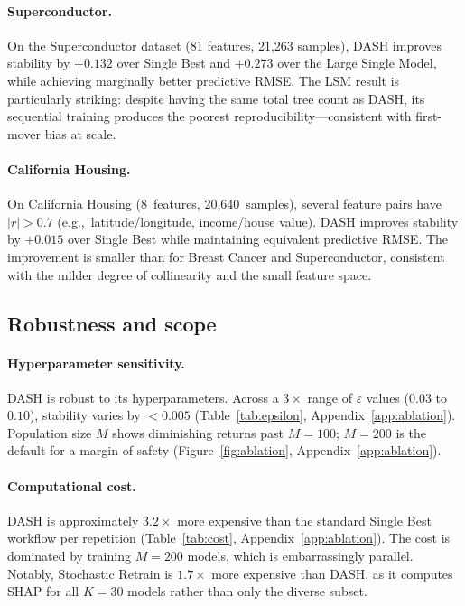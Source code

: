 \documentclass[11pt]{article}
\newcommand{\dash}{\textsc{DASH}}
\newcommand{\eg}{e.g.,\ }
\begin{document}
\paragraph{Superconductor.}
On the Superconductor dataset (81 features, 21,263 samples), \dash{}
improves stability by $+0.132$ over Single Best and $+0.273$ over the
Large Single Model, while achieving marginally better predictive RMSE.
The LSM result is particularly striking: despite having the same total tree count
as \dash{}, its sequential training produces the
poorest reproducibility---consistent with first-mover bias at scale.

\paragraph{California Housing.}
On California Housing (8~features, 20,640~samples), several feature
pairs have $|r| > 0.7$ (\eg latitude/longitude, income/house value).
\dash{} improves stability by $+0.015$ over Single Best while
maintaining equivalent predictive RMSE. The improvement is smaller than
for Breast Cancer and Superconductor, consistent with the milder degree
of collinearity and the small feature space.

\subsection{Robustness and scope}
\label{sec:robustness}

\paragraph{Hyperparameter sensitivity.}
\dash{} is robust to its hyperparameters. Across a $3\times$ range of
$\varepsilon$ values ($0.03$ to $0.10$), stability varies by $< 0.005$
(Table~\ref{tab:epsilon}, Appendix~\ref{app:ablation}).
Population size $M$ shows diminishing returns past $M = 100$;
$M = 200$ is the default for a margin of safety
(Figure~\ref{fig:ablation}, Appendix~\ref{app:ablation}).

\paragraph{Computational cost.}
\dash{} is approximately $3.2\times$ more expensive than the standard
Single Best workflow per repetition (Table~\ref{tab:cost},
Appendix~\ref{app:ablation}). The cost is dominated by training
$M = 200$ models, which is embarrassingly parallel. Notably, Stochastic
Retrain is $1.7\times$ more expensive than \dash{}, as it computes SHAP
for all $K = 30$ models rather than only the diverse subset.
\end{document}
